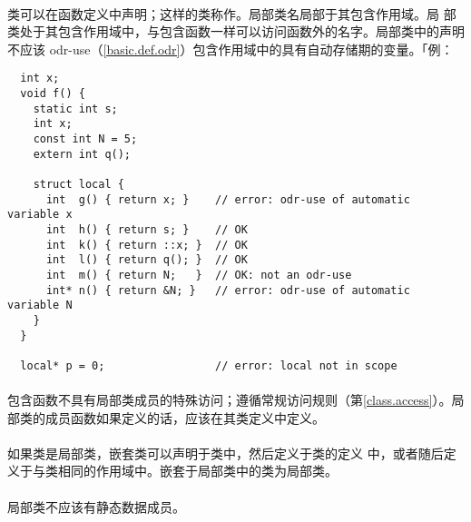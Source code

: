 \paragraph{}
类可以在函数定义中声明；这样的类称作。局部类名局部于其包含作用域。局
部类处于其包含作用域中，与包含函数一样可以访问函数外的名字。局部类中的声明不应该
odr-use（\ref{basic.def.odr}）包含作用域中的具有自动存储期的变量。「例：
\begin{lstlisting}
  int x;
  void f() {
    static int s;
    int x;
    const int N = 5;
    extern int q();

    struct local {
      int  g() { return x; }    // error: odr-use of automatic variable x
      int  h() { return s; }    // OK
      int  k() { return ::x; }  // OK
      int  l() { return q(); }  // OK
      int  m() { return N;   }  // OK: not an odr-use
      int* n() { return &N; }   // error: odr-use of automatic variable N
    }
  }

  local* p = 0;                 // error: local not in scope
\end{lstlisting}

\paragraph{}
包含函数不具有局部类成员的特殊访问；遵循常规访问规则（第\ref{class.access}）。局
部类的成员函数如果定义的话，应该在其类定义中定义。

\paragraph{}
如果类是局部类，嵌套类可以声明于类中，然后定义于类的定义
中，或者随后定义于与类相同的作用域中。嵌套于局部类中的类为局部类。

\paragraph{}
局部类不应该有静态数据成员。

